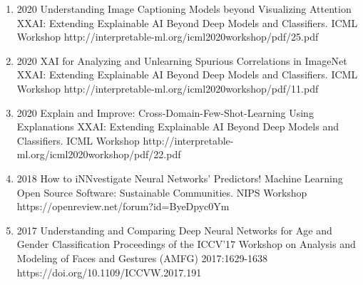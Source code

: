 {\begin{enumerate}
        \item {}
                                {2020}
                                {Understanding Image Captioning Models beyond Visualizing Attention}
                                {XXAI: Extending Explainable AI Beyond Deep Models and Classifiers. ICML Workshop}
                                {}
                                {http://interpretable-ml.org/icml2020workshop/pdf/25.pdf}


        \item {}
                                {2020}
                                {XAI for Analyzing and Unlearning Spurious Correlations in ImageNet}
                                {XXAI: Extending Explainable AI Beyond Deep Models and Classifiers. ICML Workshop}
                                {}
                                {http://interpretable-ml.org/icml2020workshop/pdf/11.pdf}


        \item {}
                                {2020}
                                {Explain and Improve: Cross-Domain-Few-Shot-Learning Using Explanations}
                                {XXAI: Extending Explainable AI Beyond Deep Models and Classifiers. ICML Workshop}
                                {}
                                {http://interpretable-ml.org/icml2020workshop/pdf/22.pdf}


        \item {}
                                {2018}
                                {How to iNNvestigate Neural Networks' Predictors!}
                                {Machine Learning Open Source Software: Sustainable Communities. NIPS Workshop}
                                {}
                                {https://openreview.net/forum?id=ByeDpyc0Ym}


        \item {}
                                {2017}
                                {Understanding and Comparing Deep Neural Networks for Age and Gender Classification}
                                {Proceedings of the ICCV'17 Workshop on Analysis and Modeling of Faces and Gestures (AMFG)}
                                {2017:1629-1638}
                                {https://doi.org/10.1109/ICCVW.2017.191}


\end{enumerate}}

